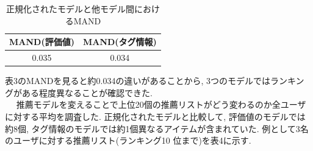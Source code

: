 \documentclass[a4j,11pt]{jarticle}           %
\begin{document}
	\begin{table}[H]
		\centering
		\caption{正規化されたモデルと他モデル間におけるMAND}
		\begin{tabular}{cc}\hline
			MAND(評価値)&MAND(タグ情報) \\ \hline
			0.035&0.034 \\ \hline
		\end{tabular}
	\end{table}

	表3のMANDを見ると約0.034の違いがあることから, 3つのモデルではランキングがある程度異なることが確認できた. 
	\\　	推薦モデルを変えることで上位20個の推薦リストがどう変わるのか全ユーザに対する平均を調査した. 正規化されたモデルと比較して, 評価値のモデルでは約8個, タグ情報のモデルでは約1個異なるアイテムが含まれていた. 例として3名のユーザに対する推薦リスト(ランキング10
	位まで)を表4に示す.
	
	
	
\end{document}
